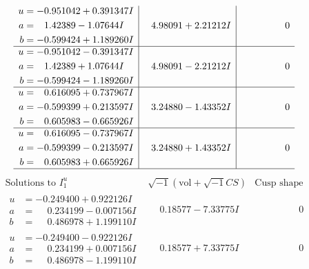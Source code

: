 \documentclass[1p]{elsarticle_modified}
\theoremstyle{definition}
\newcommand{\I}{\sqrt{-1}}
\begin{document}
$$\begin{array}{c|c|c}
\begin{aligned}
u &= -0.951042 + 0.391347 I \\
a &= \phantom{-}1.42389 - 1.07644 I \\
b &= -0.599424 + 1.189260 I\end{aligned}
 & \phantom{-}4.98091 + 2.21212 I & \phantom{-0.000000 } 0 \\ \hline\begin{aligned}
u &= -0.951042 - 0.391347 I \\
a &= \phantom{-}1.42389 + 1.07644 I \\
b &= -0.599424 - 1.189260 I\end{aligned}
 & \phantom{-}4.98091 - 2.21212 I & \phantom{-0.000000 } 0 \\ \hline\begin{aligned}
u &= \phantom{-}0.616095 + 0.737967 I \\
a &= -0.599399 + 0.213597 I \\
b &= \phantom{-}0.605983 - 0.665926 I\end{aligned}
 & \phantom{-}3.24880 - 1.43352 I & \phantom{-0.000000 } 0 \\ \hline\begin{aligned}
u &= \phantom{-}0.616095 - 0.737967 I \\
a &= -0.599399 - 0.213597 I \\
b &= \phantom{-}0.605983 + 0.665926 I\end{aligned}
 & \phantom{-}3.24880 + 1.43352 I & \phantom{-0.000000 } 0\\
 \hline 
 \end{array}$$\newpage$$\begin{array}{c|c|c}  
\text{Solutions to }I^u_{1}& \I (\text{vol} + \sqrt{-1}CS) & \text{Cusp shape}\\
 \hline 
\begin{aligned}
u &= -0.249400 + 0.922126 I \\
a &= \phantom{-}0.234199 - 0.007156 I \\
b &= \phantom{-}0.486978 + 1.199110 I\end{aligned}
 & \phantom{-}0.18577 - 7.33775 I & \phantom{-0.000000 } 0 \\ \hline\begin{aligned}
u &= -0.249400 - 0.922126 I \\
a &= \phantom{-}0.234199 + 0.007156 I \\
b &= \phantom{-}0.486978 - 1.199110 I\end{aligned}
 & \phantom{-}0.18577 + 7.33775 I & \phantom{-0.000000 } 0 \\ \hline\begin{aligned}

\end{aligned}
\end{array}$$
\end{document}
